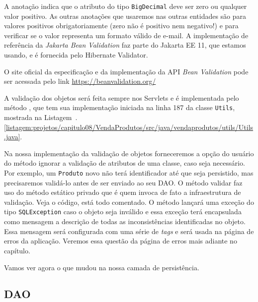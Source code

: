 A anotação  indica que o atributo do tipo \texttt{BigDecimal} deve ser zero ou qualquer valor positivo. As outras anotações que usaremos nas outras entidades são  para valores positivos obrigatoriamente (zero não é positivo nem negativo!) e  para verificar se o valor representa um formato válido de e-mail. A implementação de referência da \textit{Jakarta Bean Validation} faz parte do Jakarta EE 11, que estamos usando, e é fornecida pelo Hibernate Validator.

\begin{saibaMais}
    O site oficial da especificação e da implementação da API \textit{Bean Validation} pode ser acessada pelo link \url{https://beanvalidation.org/}
\end{saibaMais}

A validação dos objetos será feita sempre nos Servlets e é implementada pelo método , que tem sua implementação iniciada na linha 187 da classe \texttt{Utils}, mostrada na Listagem~\thechapter.\ref{listagem:projetos/capitulo08/VendaProdutos/src/java/vendaprodutos/utils/Utils.java}.


Na nossa implementação da validação de objetos forneceremos a opção do usuário do método ignorar a validação de atributos de uma classe, caso seja necessário. Por exemplo, um \texttt{Produto} novo não terá identificador até que seja persistido, mas precisaremos validá-lo antes de ser enviado ao seu DAO. O método validar faz uso do método estático privado  que é quem invoca de fato a infraestrutura de validação. Veja o código, está todo comentado. O método  lançará uma exceção do tipo \texttt{SQLException} caso o objeto seja inválido e essa exceção terá encapsulada como mensagem a descrição de todas as inconsistências identificadas no objeto. Essa mensagem será configurada com uma série de \textit{tags}  e será usada na página de erros da aplicação. Veremos essa questão da página de erros mais adiante no capítulo.

Vamos ver agora o que mudou na nossa camada de persistência.


\subsection{DAO}

